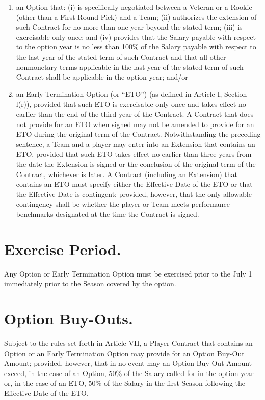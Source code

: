 \documentclass[
]{book}
\providecommand{\tightlist}{%
  \setlength{\itemsep}{0pt}\setlength{\parskip}{0pt}}
\begin{document}
\begin{enumerate}
\def\labelenumi{(\alph{enumi})}
\tightlist
\item
  an Option that: (i) is specifically negotiated between a Veteran or a Rookie (other than a First Round Pick) and a Team; (ii) authorizes the extension of such Contract for no more than one year beyond the stated term; (iii) is exercisable only once; and (iv) provides that the Salary payable with respect to the option year is no less than 100\% of the Salary payable with respect to the last year of the stated term of such Contract and that all other nonmonetary terms applicable in the last year of the stated term of such Contract shall be applicable in the option year; and/or
\item
  an Early Termination Option (or ``ETO'') (as defined in Article I, Section l(r)), provided that such ETO is exercisable only once and takes effect no earlier than the end of the third year of the Contract. A Contract that does not provide for an ETO when signed may not be amended to provide for an ETO during the original term of the Contract. Notwithstanding the preceding sentence, a Team and a player may enter into an Extension that contains an ETO, provided that such ETO takes effect no earlier than three years from the date the Extension is signed or the conclusion of the original term of the Contract, whichever is later. A Contract (including an Extension) that contains an ETO must specify either the Effective Date of the ETO or that the Effective Date is contingent; provided, however, that the only allowable contingency shall be whether the player or Team meets performance benchmarks designated at the time the Contract is signed.
\end{enumerate}

\hypertarget{exercise-period.}{%
\section{Exercise Period.}\label{exercise-period.}}

Any Option or Early Termination Option must be exercised prior to the July 1 immediately prior to the Season covered by the option.

\hypertarget{option-buy-outs.}{%
\section{Option Buy-Outs.}\label{option-buy-outs.}}

Subject to the rules set forth in Article VII, a Player Contract that contains an Option or an Early Termination Option may provide for an Option Buy-Out Amount; provided, however, that in no event may an Option Buy-Out Amount exceed, in the case of an Option, 50\% of the Salary called for in the option year or, in the case of an ETO, 50\% of the Salary in the first Season following the Effective Date of the ETO.
\end{document}
